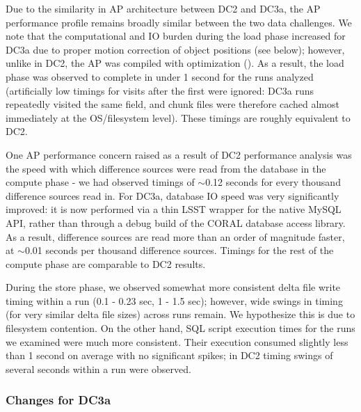 Due to the similarity in AP architecture between DC2 and DC3a, the AP
performance profile remains broadly similar between the two data challenges.
We note that the computational and IO burden during the load phase increased
for DC3a due to proper motion correction of object positions (see below);
however, unlike in DC2, the AP was compiled with optimization ().
As a result, the load phase was observed to complete in under
1 second for the runs analyzed (artificially low timings for visits after the
first were ignored: DC3a runs repeatedly visited the same field, and chunk
files were therefore cached almost immediately at the OS/filesystem level).
These timings are roughly equivalent to DC2.

One AP performance concern raised as a result of DC2 performance analysis was
the speed with which difference sources were read from the database in the
compute phase - we had observed timings of \ensuremath{\sim}0.12 seconds for
every thousand difference sources read in. For DC3a, database IO speed was
very significantly improved: it is now performed via a thin LSST wrapper for
the native MySQL API, rather than through a debug build of the CORAL database
access library. As a result, difference sources are read more than an order of
magnitude faster, at \ensuremath{\sim}0.01 seconds per thousand difference
sources. Timings for the rest of the compute phase are comparable to DC2
results.

During the store phase, we observed somewhat more consistent delta file write
timing within a run (0.1 - 0.23 sec, 1 - 1.5 sec); however, wide swings in
timing (for very similar delta file sizes) across runs remain. We hypothesize
this is due to filesystem contention. On the other hand, SQL script execution
times for the runs we examined were much more consistent. Their execution
consumed slightly less than 1 second on average with no significant spikes; in
DC2 timing swings of several seconds within a run were observed.

\subsubsection{Changes for DC3a}

